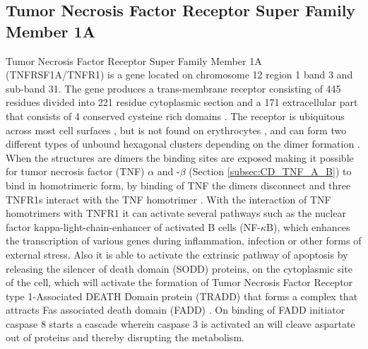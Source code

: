 \subsection{Tumor Necrosis Factor Receptor Super Family Member 1A}
Tumor Necrosis Factor Receptor Super Family Member 1A (TNFRSF1A/TNFR1) is a gene located on chromosome 12 region 1 band 3 and sub-band 31. The gene produces a trans-membrane receptor consisting of 445 residues divided into 221 residue cytoplasmic section and a 171 extracellular part that consists of 4 conserved cysteine rich domains \cite{gray_cloning_1990,walter_encyclopedia_2007,banner_crystal_1993}.
The receptor is ubiquitous across most cell surfaces , but is not found on erythrocytes \cite{segueni_innate_2016}, and can form two different types of unbound hexagonal clusters depending on the dimer formation \cite{naismith_crystallographic_1995}. 
When the structures are dimers the binding sites are exposed making it possible for tumor necrosis factor (TNF) $\alpha$ and -$\beta$  (Section \ref{subsec:CD_TNF_A_B}) to bind in homotrimeric form, by binding of TNF the dimers disconnect and three TNFR1s interact with the TNF homotrimer \cite{naismith_crystallographic_1995}.
With the interaction of TNF homotrimers with TNFR1 it can activate several pathways such as the nuclear factor kappa-light-chain-enhancer of activated B cells (NF-$\kappa$B), which enhances the transcription of various genes during inflammation, infection or other forms of external stress. Also it is able to activate the extrinsic pathway of apoptosis by releasing the silencer of death domain (SODD) proteins, on the cytoplasmic site of the cell, which will activate the formation of Tumor Necrosis Factor Receptor type 1-Associated DEATH Domain protein (TRADD) \cite{bender_adaptor_2005}
 that forms a complex that attracts Fas associated death domain (FADD) \cite{muppidi_life_2004}. 
On binding of FADD initiator caspase 8  starts a cascade wherein caspase 3 is activated an will cleave aspartate out of proteins and thereby disrupting the metabolism\cite{vinay_robbins_2014,chen_tnf-r1_2002,hengartner_biochemistry_2000}.
\label{subsec:CD_TNFRSF1A}

